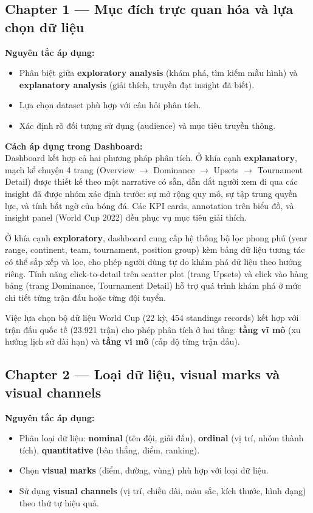 \documentclass[12pt,a4paper]{article}
\begin{document}
\subsection{Chapter 1 --- Mục đích trực quan hóa và lựa chọn dữ liệu}
\textbf{Nguyên tắc áp dụng:}
\begin{itemize}
    \item Phân biệt giữa \textbf{exploratory analysis} (khám phá, tìm kiếm mẫu hình) và \textbf{explanatory analysis} (giải thích, truyền đạt insight đã biết).
    \item Lựa chọn dataset phù hợp với câu hỏi phân tích.
    \item Xác định rõ đối tượng sử dụng (audience) và mục tiêu truyền thông.
\end{itemize}

\textbf{Cách áp dụng trong Dashboard:} \\
Dashboard kết hợp cả hai phương pháp phân tích. Ở khía cạnh \textbf{explanatory}, mạch kể chuyện 4 trang (Overview $\rightarrow$ Dominance $\rightarrow$ Upsets $\rightarrow$ Tournament Detail) được thiết kế theo một narrative có sẵn, dẫn dắt người xem đi qua các insight đã được nhóm xác định trước: sự mở rộng quy mô, sự tập trung quyền lực, và tính bất ngờ của bóng đá. Các KPI cards, annotation trên biểu đồ, và insight panel (World Cup 2022) đều phục vụ mục tiêu giải thích.

Ở khía cạnh \textbf{exploratory}, dashboard cung cấp hệ thống bộ lọc phong phú (year range, continent, team, tournament, position group) kèm bảng dữ liệu tương tác có thể sắp xếp và lọc, cho phép người dùng tự do khám phá dữ liệu theo hướng riêng. Tính năng click-to-detail trên scatter plot (trang Upsets) và click vào hàng bảng (trang Dominance, Tournament Detail) hỗ trợ quá trình khám phá ở mức chi tiết từng trận đấu hoặc từng đội tuyển.

Việc lựa chọn bộ dữ liệu World Cup (22 kỳ, 454 standings records) kết hợp với trận đấu quốc tế (23.921 trận) cho phép phân tích ở hai tầng: \textbf{tầng vĩ mô} (xu hướng lịch sử dài hạn) và \textbf{tầng vi mô} (cấp độ từng trận đấu).

\subsection{Chapter 2 --- Loại dữ liệu, visual marks và visual channels}
\textbf{Nguyên tắc áp dụng:}
\begin{itemize}
    \item Phân loại dữ liệu: \textbf{nominal} (tên đội, giải đấu), \textbf{ordinal} (vị trí, nhóm thành tích), \textbf{quantitative} (bàn thắng, điểm, ranking).
    \item Chọn \textbf{visual marks} (điểm, đường, vùng) phù hợp với loại dữ liệu.
    \item Sử dụng \textbf{visual channels} (vị trí, chiều dài, màu sắc, kích thước, hình dạng) theo thứ tự hiệu quả.
\end{itemize}
\end{document}
